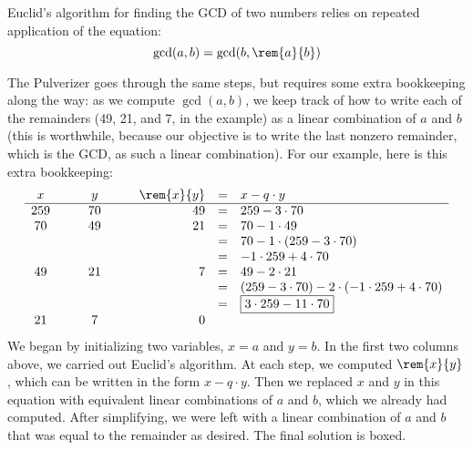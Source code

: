 \documentclass[handout]{mcs}
\begin{document}
{Euclid's algorithm for finding the GCD of two numbers relies on
repeated application of the equation: 
\[
\gcd(a, b) = \gcd(b, \rem{a}{b})
\]
\iffalse
For example, we can compute the GCD of 259 and 70 as follows:
\[
\begin{array}{rclcl}
\gcd(259, 70)
    & = & \gcd(70, 49) & \quad & \text{since $\rem{259}{70} = 49$}\\
    & = & \gcd(49, 21) && \text{since $\rem{70}{49} = 21$} \\
    & = & \gcd(21, 7) && \text{since $\rem{49}{21} = 7$} \\
    & = & \gcd(7, 0) && \text{since $\rem{21}{7} = 0$} \\
    & = & 7.
\end{array}
\]
\fi
The Pulverizer goes through the same steps, but requires some extra
bookkeeping along the way: as we compute $\gcd(a, b)$, we keep track
of how to write each of the remainders (49, 21, and 7, in the example)
as a linear combination of $a$ and $b$ (this is worthwhile, because
our objective is to write the last nonzero remainder, which is the
GCD, as such a linear combination).  For our example, here is this
extra bookkeeping:
\[
\begin{array}{ccccrcl}
x & \quad & y & \quad & \rem{x}{y} & = & x - q \cdot y \\ \hline
259 && 70 && 49 & = &   259 - 3 \cdot 70 \\
70 && 49 && 21  & = &   70 - 1 \cdot 49 \\
&&&&            & = &   70 - 1 \cdot (259 - 3 \cdot 70) \\
&&&&            & = &   -1 \cdot 259 + 4 \cdot 70 \\
49 && 21 && 7   & = &   49 - 2 \cdot 21 \\
&&&&            & = &   (259 - 3 \cdot 70) -
                                2 \cdot (-1 \cdot 259 + 4 \cdot 70) \\
&&&&            & = &   \fbox{$3 \cdot 259 - 11 \cdot 70$} \\
21 && 7 && 0
\end{array}
\]
We began by initializing two variables, $x = a$ and $y = b$.  In the
first two columns above, we carried out Euclid's algorithm.  At each
step, we computed $\rem{x}{y}$, which can be written in the form $x -
q \cdot y$. \iffalse (Remember that the Division Algorithm says $x = q
\cdot y + r$, where $r$ is the remainder.  We get $r = x - q \cdot y$
by rearranging terms.)\fi Then we replaced $x$ and $y$ in this
equation with equivalent linear combinations of $a$ and $b$, which we
already had computed.  After simplifying, we were left with a linear
combination of $a$ and $b$ that was equal to the remainder as desired.
The final solution is boxed.}\fi




\end{document}
